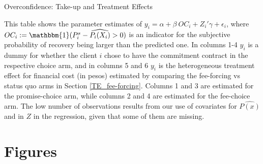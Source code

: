 \documentclass[oneside,11pt]{article}
\begin{document}
\vspace{3ex}

\vspace{.3in}

\begin{table}[H]
\caption{Overconfidence: Take-up and Treatment Effects}
\label{oc_reg}
\begin{center}
\scriptsize{}
\end{center}
 \footnotesize This table shows the parameter estimates of $y_i = \alpha + \beta \: OC_i + Z_i'\gamma + \epsilon_i$, where $OC_i:=\mathbbm{1}(P^s_i-\widehat{P_i(X_i)}>0)$ is an indicator for the subjective probability of recovery being larger than the predicted one. In columns 1-4 $y_i$ is a dummy for whether the client $i$ chose to have the commitment contract in the respective choice arm, and in columns 5 and 6 $y_i$ is the heterogeneous treatment effect for financial cost (in pesos) estimated by comparing the fee-forcing vs status quo arms in Section \ref{TE_fee-forcing}. Columns 1 and 3 are estimated for the promise-choice arm, while columns 2 and 4 are estimated for the fee-choice arm. The low number of observations results from  our use of  covariates for $\widehat{P(x)}$ and in $Z$ in the regression, given that some of them are missing.
\end{table}




\section{Figures}
\end{document}
